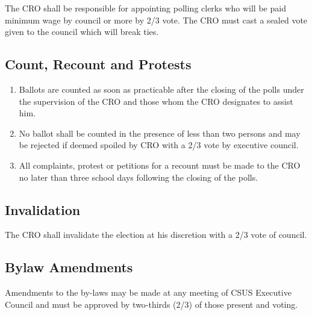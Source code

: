 The CRO shall be responsible for appointing polling clerks who will be
paid minimum wage by council or more by 2/3 vote. The CRO must cast a
sealed vote given to the council which will break ties.

\subsection{Count, Recount and
Protests}\label{count-recount-and-protests}

\begin{enumerate}
\def\labelenumi{\arabic{enumi}.}
\item
  Ballots are counted as soon as practicable after the closing of the
  polls under the supervision of the CRO and those whom the CRO
  designates to assist him.
\item
  No ballot shall be counted in the presence of less than two persons
  and may be rejected if deemed spoiled by CRO with a 2/3 vote by
  executive council.
\item
  All complaints, protest or petitions for a recount must be made to the
  CRO no later than three school days following the closing of the
  polls.
\end{enumerate}

\subsection{Invalidation}\label{invalidation}

The CRO shall invalidate the election at his discretion with a 2/3 vote
of council.

\subsection{Bylaw Amendments}\label{bylaw-amendments}

Amendments to the by-laws may be made at any meeting of CSUS Executive
Council and must be approved by two-thirds (2/3) of those present and
voting.

